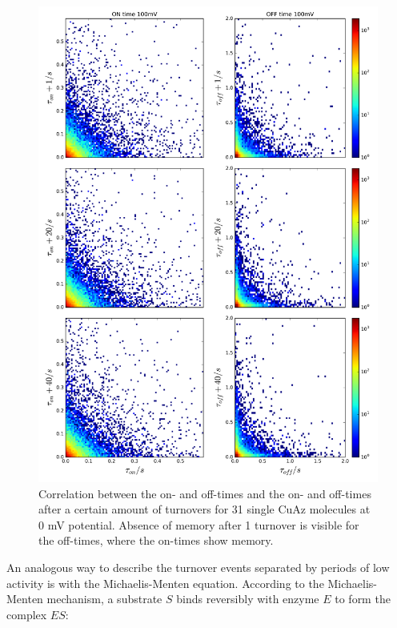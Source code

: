 \documentclass[twoside,single]{lion-msc}
\begin{document}
\begin{figure}[ht!]
\centering
\includegraphics[width=.9\textwidth]{100mv_plus100}
\caption{Correlation between the on- and off-times and the on- and off-times after a certain amount of turnovers for 31 single CuAz molecules at 0 mV potential. Absence of memory after 1 turnover is visible for the off-times, where the on-times show memory.}
\label{on_plotjes_2}
\end{figure}

\newpage


An analogous way to describe the turnover events separated by periods of low activity is with the Michaelis-Menten equation. According to the Michaelis-Menten mechanism, a substrate $S$ binds reversibly with enzyme $E$ to form the complex $ES$:
\end{document}
